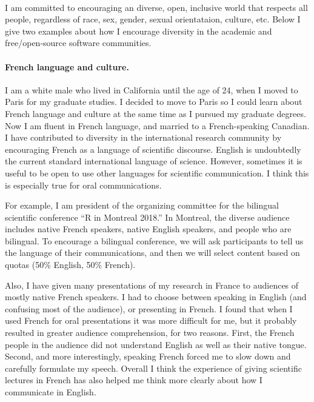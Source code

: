 \documentclass{article}
\begin{document}
\mbox{ }


I am committed to encouraging an diverse, open, inclusive world that
respects all people, regardless of race, sex, gender, sexual
orientataion, culture, etc. Below I give two examples about how I
encourage diversity in the academic and free/open-source software
communities.

\paragraph{French language and culture.}
I am a white male who lived in California until the age of 24, when I
moved to Paris for my graduate studies. I decided to move to Paris so
I could learn about French language and culture at the same time as I
pursued my graduate degrees. Now I am fluent in French language, and
married to a French-speaking Canadian.
I have contributed to diversity in the international research
community by encouraging French as a language of scientific
discourse. English is undoubtedly the current standard international
language of science. However, sometimes it is useful to be open to use
other languages for scientific communication. I think this is
especially true for oral communications.

For example, I am president of the organizing committee for the
bilingual scientific conference ``R in Montreal 2018.'' In Montreal,
the diverse audience includes native French speakers, native English
speakers, and people who are bilingual. To encourage a bilingual
conference, we will ask participants to tell us the language of their
communications, and then we will select content based on quotas (50\%
English, 50\% French).


Also, I have given many presentations of my research in
France to audiences of mostly native French speakers. I had to choose
between speaking in English (and confusing most of the audience), or
presenting in French. I found that when I used French for oral
presentations it was more difficult for me, but it probably resulted
in greater audience comprehension, for two reasons. First, the French
people in the audience did not understand English as well as their
native tongue. Second, and more interestingly, speaking French forced
me to slow down and carefully formulate my speech. Overall I think the
experience of giving scientific lectures in French has also helped me
think more clearly about how I communicate in English. 
\end{document}
